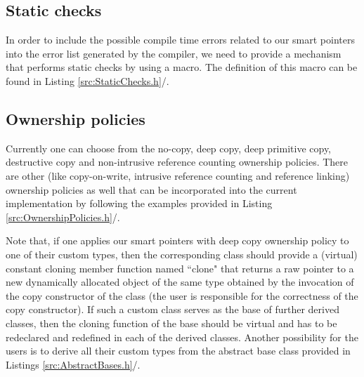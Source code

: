 \documentclass[b5paper, twosided]{book}
\DeclareRobustCommand{\mref}[1]{\ref{#1}{\relsize{-1}/\pageref{#1}}}
\begin{document}

\subsection{Static checks}

In order to include the possible compile time errors related to our smart pointers into the error list generated by the compiler, we need to provide a mechanism that performs static checks by using a macro. The definition of this macro can be found in Listing \mref{src:StaticChecks.h}.


\subsection{Ownership policies}

Currently one can choose from the no-copy, deep copy, deep primitive copy, destructive copy and non-intrusive reference counting ownership policies. There are other (like copy-on-write, intrusive reference counting and reference linking) ownership policies as well that can be incorporated into the current implementation by following the examples provided in Listing \mref{src:OwnershipPolicies.h}.

Note that, if one applies our smart pointers with deep copy ownership policy to one of their custom types, then the corresponding class should provide a (virtual) constant cloning member function named ``clone" that returns a raw pointer to a new dynamically allocated object of the same type obtained by the invocation of the copy constructor of the class (the user is responsible for the correctness of the copy constructor). If such a custom class serves as the base of further derived classes, then the cloning function of the base should be virtual and has to be redeclared and redefined in each of the derived classes. Another possibility for the users is to derive all their custom types from the abstract base class provided in Listings \mref{src:AbstractBases.h}.

\end{document}
